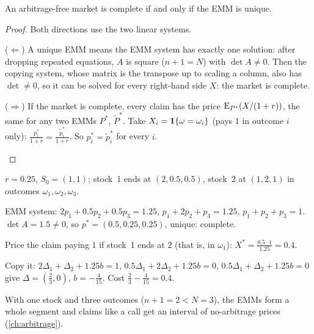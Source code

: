 \begin{theorem}
\label{thm:complete}
An arbitrage-free market is complete if and only if the EMM is unique.
\end{theorem}
\begin{proof}
Both directions use the two linear systems.
\begin{steps}
  \item ($\Leftarrow$) A unique EMM means the EMM system has exactly one solution: after dropping repeated equations, $A$ is square ($n+1=N$) with $\det A\ne0$. Then the copying system, whose matrix is the transpose up to scaling a column, also has $\det\ne0$, so it can be solved for every right-hand side $X$: the market is complete.
  \item ($\Rightarrow$) If the market is complete, every claim has the price $\operatorname{E}_{P^*}(X/(1+r))$, the same for any two EMMs $P^*$, $\tilde P^*$. Take $X_i=\mathbf{1}\{\omega=\omega_i\}$ (pays $1$ in outcome $i$ only): $\frac{p^*_i}{1+r}=\frac{\tilde p^*_i}{1+r}$. So $p^*_i=\tilde p^*_i$ for every $i$. \qedhere
\end{steps}
\end{proof}

\begin{example}
\label{ex:two-stocks}
$r=0.25$, $S_0=(1,1)$; stock~1 ends at $(2,0.5,0.5)$, stock~2 at $(1,2,1)$ in outcomes $\omega_1,\omega_2,\omega_3$.
\begin{steps}
  \item EMM system: $2p_1+0.5p_2+0.5p_3=1.25$, $p_1+2p_2+p_3=1.25$, $p_1+p_2+p_3=1$. $\det A=1.5\ne0$, so $p^*=(0.5,0.25,0.25)$, unique: complete.
  \item Price the claim paying $1$ if stock~1 ends at $2$ (that is, in $\omega_1$): $X^*=\frac{0.5\cdot1}{1.25}=0.4$.
  \item Copy it: $2\Delta_1+\Delta_2+1.25b=1$, $0.5\Delta_1+2\Delta_2+1.25b=0$, $0.5\Delta_1+\Delta_2+1.25b=0$ give $\Delta=(\frac23,0)$, $b=-\frac{4}{15}$. Cost $\frac23-\frac4{15}=0.4$.
\end{steps}
\end{example}

With one stock and three outcomes ($n+1=2<N=3$), the EMMs form a whole segment and claims like a call get an interval of no-arbitrage prices (\cref{ch:arbitrage}).


